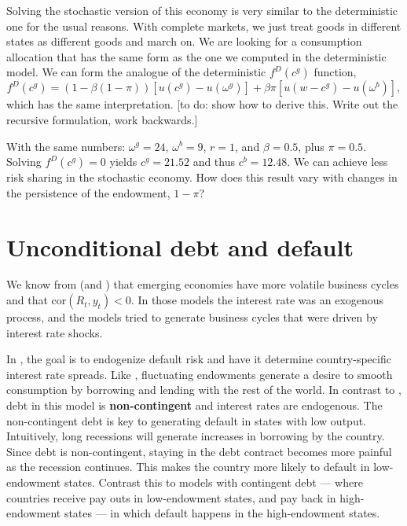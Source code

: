 \documentclass[11pt, pdftex]{article}
\newcommand{\cor}{\mathrm{cor}}
\begin{document}
Solving the stochastic version of this economy is very similar to the deterministic one for the usual reasons.  With complete markets, we just treat goods in different states as different goods and march on.  We are looking for a consumption allocation that has the same form as the one we computed in the  deterministic model.  We can form the analogue of the deterministic ${f^D}({c^g})$ function,
\begin{equation}\label{}
  {f^D}({c^g}) = (1 - \beta (1 - \pi ))\left[ {u({c^g}) - u({\omega ^g})} \right] + \beta \pi \left[ {u(w - {c^g}) - u({\omega ^b})} \right],
\end{equation}
which has the same interpretation.  [to do: show how to derive this.  Write out the recursive formulation, work backwards.]

With the same numbers: ${\omega ^g} = 24$, ${\omega ^b} = 9$, $r = 1$, and $\beta  = 0.5$, plus $\pi  = 0.5$.  Solving ${f^D}\left( {{c^g}} \right) = 0$ yields ${c^g} = 21.52$ and thus ${c^b} = 12.48$.  We can achieve less risk sharing in the stochastic economy.  How does this result vary with changes in the persistence of the endowment, $1 - \pi $?


\section{Unconditional debt and default}
We know from \citet{NP05} (and \cite{uribeYu}) that emerging economies have more volatile business cycles and that $\cor\left(R_t,y_t \right) <0$.  In those models the interest rate was an exogenous process, and the models tried to generate business cycles that were driven by interest rate shocks.

In \citet{A08}, the goal is to endogenize default risk and have it determine country-specific interest rate spreads.  Like  \citet{EG81}, fluctuating endowments generate a desire to smooth consumption by borrowing and lending with the rest of the world.  In contrast to \citet{EG81}, debt in this model is \textbf{non-contingent} and interest rates are endogenous.  The non-contingent debt is key to generating default in states with low output.  Intuitively, long recessions will generate increases in borrowing by the country.  Since debt is non-contingent, staying in the debt contract becomes more painful as the recession continues.  This makes the country more likely to default in low-endowment states. Contrast this to models with contingent debt --- where countries receive pay outs in low-endowment states, and pay back in high-endowment states --- in which default happens in the high-endowment states.
\end{document}
